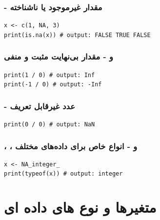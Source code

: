 \documentclass[11pt, a4paper, oneside]{book}
\begin{document}
			\subsection{ - مقدار غیرموجود یا ناشناخته }
				\begin{latin}
					\begin{lstlisting}[caption={\lr{NA}}]
x <- c(1, NA, 3)
print(is.na(x)) # output: FALSE TRUE FALSE
					\end{lstlisting}
				\end{latin}
				
			\subsection{ و  - مقدار بی‌نهایت مثبت و منفی}
				\begin{latin}
					\begin{lstlisting}[caption={\lr{Inf, -Inf}}]
print(1 / 0) # output: Inf
print(-1 / 0) # output: -Inf
					\end{lstlisting}
				\end{latin}
				
			\subsection{ - عدد غیرقابل تعریف }
				\begin{latin}
					\begin{lstlisting}[caption={\lr{NaN}}]
print(0 / 0) # output: NaN
					\end{lstlisting}
				\end{latin}
				
			\subsection{، ،  و  - انواع خاص  برای داده‌های مختلف}
				\begin{latin}
					\begin{lstlisting}[caption={\lr{NA\_integer\_, NA\_real\_, NA\_complex\_, NA\_character\_}}]
x <- NA_integer_
print(typeof(x)) # output: integer
					\end{lstlisting}
				\end{latin}
	\chapter{متغیرها و نوع های داده ای}

			
\end{document}
